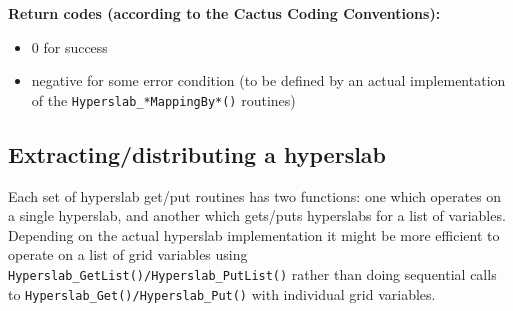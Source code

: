 \documentclass{article}
\begin{document}
{\bf Return codes (according to the Cactus Coding Conventions):}
\begin{itemize}
  \item 0 for success
  \item negative for some error condition (to be defined by an actual
    implementation of the {\tt Hyperslab\_*MappingBy*()} routines)
\end{itemize}


\subsection{Extracting/distributing a hyperslab}

Each set of hyperslab get/put routines has two functions: one
which operates on a single hyperslab, and another which gets/puts hyperslabs
for a list of variables.
Depending on the actual hyperslab implementation it might be more efficient
to operate on a list of grid variables using
{\tt Hyperslab\_GetList()/Hyperslab\_PutList()} rather than doing sequential
calls to {\tt Hyperslab\_Get()/Hyperslab\_Put()} with individual grid variables.
\end{document}
